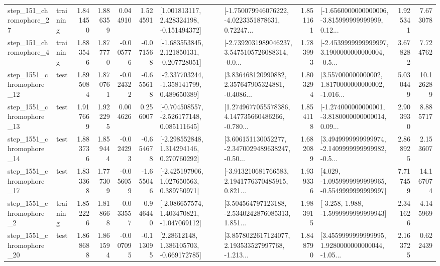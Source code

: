 \begin{tabular}{llrrrrllrlrr}
  step\_151\_chromophore\_27 &  training &      1.841450 &    1.886359 &      0.044910 &  1.524591 &    [1.001813117, 2.428324198, -0.151494372] &  [-1.750079946076222, -4.0223351878631, 0.72247... &       1.851161 &  [-1.6560000000000006, -3.815999999999999, 0.12... &            1.925341 &          7.673078 \\
   step\_151\_chromophore\_4 &  training &      1.883546 &    1.877770 &     -0.005776 & -0.071568 &   [-1.683553845, 2.121850131, -0.207728051] &  [-2.7392031989046237, 3.5475105726088314, -0.0... &       1.783993 &  [-2.4539999999999997, 3.1900000000000004, -0.5... &            3.678282 &          7.724762 \\
 step\_1551\_chromophore\_12 &      test &      1.895084 &    1.870761 &     -0.024322 & -0.655618 &   [-2.337703244, -1.358141799, 0.489650389] &  [3.836468120990882, 2.357647905324881, -0.4086... &       1.803294 &  [3.557000000000002, 1.8170000000000002, -1.016... &            5.030449 &         10.126289 \\
 step\_1551\_chromophore\_13 &      test &      1.917669 &    1.922295 &      0.004626 &  0.256007 &   [-0.704508557, -2.526177148, 0.085111645] &  [1.2749677055578386, 4.147735660486266, -0.780... &       1.854118 &  [-1.274000000000001, -3.8180000000000014, 0.09... &            2.903930 &          8.885717 \\
 step\_1551\_chromophore\_14 &      test &      1.883736 &    1.859444 &     -0.024293 & -0.654678 &    [-2.298552848, 1.314294146, 0.270760292] &  [3.606151130052277, -2.3470029489638247, -0.50... &       1.682089 &  [3.4949999999999974, -2.1409999999999982, -0.5... &            2.868925 &          2.153607 \\
 step\_1551\_chromophore\_17 &      test &      1.833368 &    1.777309 &     -0.056059 & -1.655046 &    [-2.425197906, 1.027650563, 0.389750971] &  [-3.913210681766583, 2.1941776370485915, 0.821... &       1.939336 &  [4.029, -1.0959999999999965, -0.5549999999999997] &            7.717459 &         14.167074 \\
  step\_1551\_chromophore\_2 &  training &      1.852226 &    1.818668 &     -0.033557 & -0.946440 &   [-2.086657574, 1.403470821, -1.047069112] &  [3.504564797123188, -2.5340242876085313, 1.851... &       1.983915 &               [-3.258, 1.988, -1.5999999999999943] &            2.341626 &          4.145969 \\
 step\_1551\_chromophore\_20 &      test &      1.868688 &    1.861594 &     -0.007095 & -0.113095 &     [2.28612148, 1.386105703, -0.669172785] &  [3.8578022617124077, 2.193533527997768, -1.213... &       1.848790 &  [3.4559999999999995, 1.9280000000000044, -1.05... &            2.163725 &          0.622439 \\

\end{tabular}
